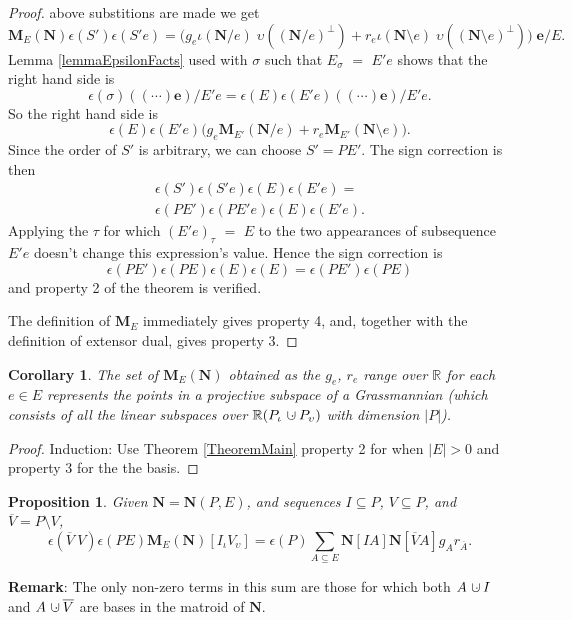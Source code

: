 \documentclass[12pt]{article}
\newtheorem{proposition}[theorem]{Proposition}
\newtheorem{corollary}[theorem]{Corollary}
\theoremstyle{definition}
\newcommand{\Remark}{\textbf{Remark}}
\newcommand{\dunion}
{\mbox{\hbox{\hskip6pt$\cdot$\hskip-5.50pt$\cup$\hskip2pt}}}
\newcommand{\scomp}[1]{\ensuremath{\overline{#1}}}
\newcommand{\scma}{\ensuremath{\ }}
\newcommand{\Is}{\ensuremath{\iota}}
\newcommand{\Vs}{\ensuremath{\upsilon}}
\newcommand{\Reals}{\ensuremath{\mathbb{R}}}
\newcommand{\Card}[1]{\ensuremath{{\left|#1\right|}}}
\newcommand{\ext}[1]{\ensuremath{\mathbf{#1}}}
\begin{document}
\begin{proof}
above substitions are made we get
\[
\ext{M}_E(\ext{N})\epsilon(S')\epsilon(S'e) =
\big(g_e \Is(\ext{N}/e)\;\Vs((\ext{N}/e)^\perp)+
r_e\Is(\ext{N}\setminus e)\;\Vs((\ext{N}\setminus e)^\perp)\big)\;\ext{e}/E.
\]
Lemma \ref{lemmaEpsilonFacts} used with $\sigma$ such that
$E_\sigma$ $=$ $E'e$ shows that the right hand side is
\[
\epsilon(\sigma)((\cdots)\ext{e})/E'e = 
\epsilon(E)\epsilon(E'e)((\cdots)\ext{e})/E'e.
\]
So the right hand side is
\[
\epsilon(E)\epsilon(E'e)\big(g_e\ext{M}_{E'}(\ext{N}/e)+r_e\ext{M}_{E'}(\ext{N}\setminus e)\big).
\]
Since the order of $S'$ is arbitrary, we can choose $S'=PE'$.  The sign correction is then
\begin{equation*}
\begin{split}
\epsilon(S')\epsilon(S'e)\epsilon(E)\epsilon(E'e)=\\
\epsilon(PE')\epsilon(PE'e)\epsilon(E)\epsilon(E'e).
\end{split}
\end{equation*}
Applying the $\tau$ for which $(E'e)_\tau$ $=$ $E$ to the two
appearances of subsequence $E'e$ doesn't change this expression's value. 
Hence the sign correction is
\[
\epsilon(PE')\epsilon(PE)\epsilon(E)\epsilon(E)=\epsilon(PE')\epsilon(PE)
\]
and property 2 of the theorem is verified.

The definition of $\ext{M}_E$ immediately gives property 4, and, together
with the definition of extensor dual, gives property 3.
\end{proof}


\begin{corollary}
The set of $\ext{M}_E(\ext{N})$ 
obtained as the $g_e$, $r_e$ range over $\Reals$ for
each $e\in E$ represents the points in a 
projective subspace of a Grassmannian 
(which consists of all the
linear subspaces over $\Reals (P_{\Is}\dunion P_{\Vs})$ 
with 
dimension $\Card{P}$).
\end{corollary}


\begin{proof}
Induction: Use Theorem \ref{TheoremMain} property 2 for when $|E|>0$ and 
property 3
for the the basis.
\end{proof}

\begin{proposition}Given $\ext{N}=\ext{N}(P,E)$,
and sequences $I\subseteq P$, $V\subseteq P$, and $\scomp{V}=P\setminus V$,
\label{PropositionMain}
\[
\epsilon(\scomp{V}\scma V)\epsilon(PE)\ext{M}_E(\ext{N})[I_{\Is}V_{\Vs}] = 
\epsilon(P)\sum_{A\subseteq E}\ext{N}[IA]\ext{N}
[\scomp{V}A]g_Ar_{\scomp{A}}.
\]
\end{proposition}
\Remark: The only non-zero terms in this sum are those for which both $A\dunion I$
and $A\dunion \scomp{V}$ are bases in the matroid of $\ext{N}$.
\end{document}
